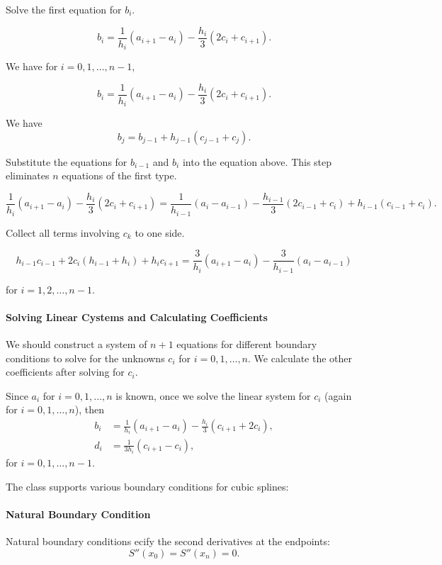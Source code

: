 \documentclass[a4paper]{article}
\begin{document}
\begin{sloppypar}
Solve the first equation for \(b_i\).

\[ b_i = \frac{1}{h_i}(a_{i+1} - a_i) - \frac{h_i}{3}(2c_i + c_{i+1}). \]

We have for \(i = 0, 1, \ldots, n-1\),

\[ b_i = \frac{1}{h_i}(a_{i+1} - a_i) - \frac{h_i}{3}(2c_i + c_{i+1}). \]

We have
$$
b_j=b_{j-1}+h_{j-1}(c_{j-1}+c_j).
$$

Substitute the equations for \(b_{i-1}\) and \(b_{i}\) into the equation above. This step eliminates \(n\) equations of the first type.

\[ 
\frac{1}{h_{i}}(a_{i+1} - a_{i}) - \frac{h_{i}}{3}(2c_{i} + c_{i+1}) = \frac{1}{h_{i-1}}(a_{i} - a_{i-1}) - \frac{h_{i-1}}{3}(2c_{i-1} + c_{i}) + h_{i-1}(c_{i-1} + c_{i}).
\]

Collect all terms involving \(c_{k}\) to one side.

\[ 
h_{i-1}c_{i-1} + 2c_{i}(h_{i-1} + h_{i}) + h_{i}c_{i+1} = \frac{3}{h_{i}}(a_{i+1} - a_{i}) - \frac{3}{h_{i-1}}(a_{i} - a_{i-1})
\]

for \(i = 1, 2, \ldots, n-1\).

\paragraph*{Solving Linear Cystems and Calculating Coefficients}

We should construct a system of \(n+1\) equations for different boundary conditions to solve for the unknowns \(c_{i}\) for \(i = 0, 1, \ldots, n\). We calculate the other coefficients after solving for \(c_{i}\).

Since \(a_{i}\) for \(i=0,1,\ldots,n\) is known, once we solve the linear system for \(c_{i}\) (again for \(i=0,1,\ldots,n\)), then
$$
\begin{aligned}
b_{i} &= \frac{1}{h_{i}}(a_{i+1} - a_{i}) - \frac{h_{i}}{3}(c_{i+1} + 2c_{i}), \\
d_{i} &= \frac{1}{3h_{i}}(c_{i+1} - c_{i}),
\end{aligned}
$$
for \(i=0,1,\ldots,n-1\).

The class supports various boundary conditions for cubic splines:

\paragraph*{Natural Boundary Condition}
Natural boundary conditions ecify the second derivatives at the endpoints:
\[ S''(x_0) = S''(x_n) = 0. \]


\end{sloppypar}
\end{document}
